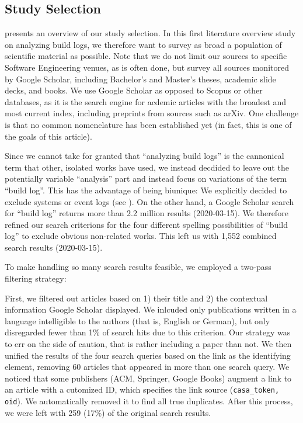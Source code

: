 \subsection{Study Selection}

 presents an overview of our study selection.
In this first literature overview study on analyzing build logs, we
therefore want to survey as broad a population of scientific material
as possible. Note that we do not limit our sources to specific
Software Engineering venues, as is often done, but survey all sources
monitored by Google Scholar, including Bachelor's and Master's theses,
academic slide decks, and books. We use Google Scholar as opposed to
Scopus or other databases, as it is the search engine for acdemic
articles with the broadest and most current index, including preprints
from sources such as arXiv. One challenge is that no common
nomenclature has been established yet (in fact, this is one of the
goals of this article).

Since we cannot take for granted that ``analyzing build logs'' is the
cannonical term that other, isolated works have used, we instead
decdided to leave out the potentially variable ``analysis'' part and
instead focus on variations of the term ``build log''. This has the
advantage of being biunique: We explicitly decided to exclude systems
or event logs (see ). On the other hand, a Google Scholar
search for ``build log'' returns more than 2.2 million results
(2020-03-15). We therefore refined our search criterions for the four
different spelling possibilities of ``build log'' to exclude obvious
non-related works. This left us with 1,552 combined search results
(2020-03-15).

To make handling so many search results feasible, we employed a
two-pass filtering strategy:

First, we filtered out articles based on 1) their title and 2) the
contextual information Google Scholar displayed. We inlcuded only
publications written in a language intelligible to the authors (that
is, English or German), but only disregarded fewer than 1\% of search
hits due to this criterion. Our strategy was to err on the side of
caution, that is rather including a paper than not. We then unified
the results of the four search queries based on the link as the
identifying element, removing 60 articles that appeared in more than
one search query. We noticed that some publishers (ACM, Springer,
Google Books) augment a link to an article with a cutomized ID, which
specifies the link source ({\tt casa\_token, oid}). We automatically
removed it to find all true duplicates. After this process, we were
left with 259 (17\%) of the original search results.

